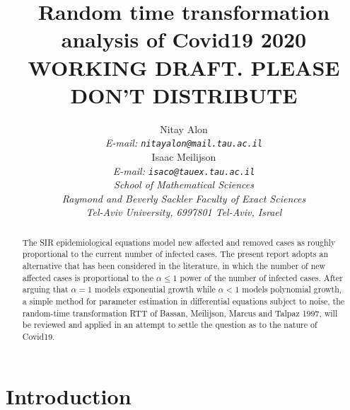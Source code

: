 \documentclass{article}
\begin{document}
\title {Random time transformation analysis of Covid19 2020 \\
WORKING DRAFT. PLEASE DON'T DISTRIBUTE
}

\author {
Nitay Alon
\\
{\em E-mail: \tt{nitayalon@mail.tau.ac.il}} \\
Isaac Meilijson
\\
{\em E-mail: \tt{isaco@tauex.tau.ac.il}} \\
{\em School of Mathematical Sciences} \\
{\em Raymond and Beverly Sackler Faculty of Exact Sciences} \\
{\em Tel-Aviv University, 6997801 Tel-Aviv, Israel} \\
}


\maketitle


\begin{abstract}
\noindent The SIR epidemiological equations model new affected and removed cases as roughly proportional to the current number of infected cases. The present report adopts an alternative that has been considered in the literature, in which the number of new affected cases is proportional to the $\alpha \le 1$ power of the number of infected cases. After arguing that $\alpha=1$ models exponential growth while $\alpha<1$ models polynomial growth, a simple method for parameter estimation in differential equations subject to noise, the random-time transformation RTT of Bassan, Meilijson, Marcus and Talpaz 1997, will be reviewed and applied in an attempt to settle the question as to the nature of Covid19.

%
\end{abstract}





\section{Introduction} \label{introduction}
\end{document}
